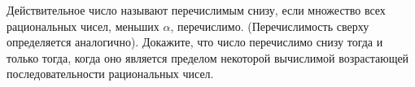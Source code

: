 Действительное число называют перечислимым снизу, если множество всех рациональных чисел, меньших $\alpha$,
перечислимо. (Перечислимость сверху определяется аналогично). Докажите, что число перечислимо снизу тогда и только тогда,
когда оно является пределом некоторой вычислимой возрастающей последовательности рациональных чисел.